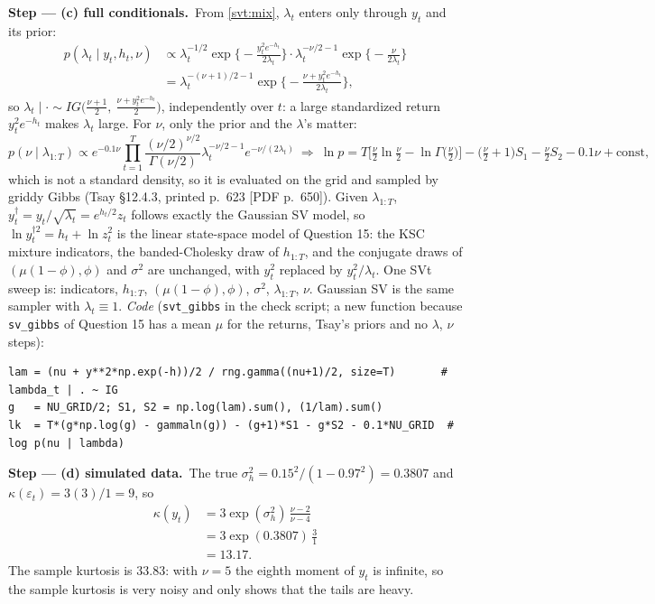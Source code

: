 \documentclass[11pt,a4paper]{article}
\newcommand{\passo}[2]{\par\smallskip\noindent\textbf{Step --- #1.}~#2}
\begin{document}
\begin{sol}
\passo{(c) full conditionals}{From \eqref{svt:mix}, $\lambda_t$ enters only through $y_t$ and its prior:}
\begin{align*}
p(\lambda_t\mid y_t,h_t,\nu) &\propto \lambda_t^{-1/2}\exp\!\Big\{-\frac{y_t^2e^{-h_t}}{2\lambda_t}\Big\}\cdot\lambda_t^{-\nu/2-1}\exp\!\Big\{-\frac{\nu}{2\lambda_t}\Big\}\\
&= \lambda_t^{-(\nu+1)/2-1}\exp\!\Big\{-\frac{\nu+y_t^2e^{-h_t}}{2\lambda_t}\Big\},
\end{align*}
so $\lambda_t\mid\cdot\sim IG\big(\tfrac{\nu+1}{2},\ \tfrac{\nu+y_t^2e^{-h_t}}{2}\big)$, independently over $t$: a large
standardized return $y_t^2e^{-h_t}$ makes $\lambda_t$ large. For $\nu$, only the prior and the $\lambda$'s matter:
\[ p(\nu\mid\lambda_{1:T})\propto e^{-0.1\nu}\prod_{t=1}^T\frac{(\nu/2)^{\nu/2}}{\Gamma(\nu/2)}\lambda_t^{-\nu/2-1}e^{-\nu/(2\lambda_t)}
\ \Rightarrow\ \ln p=T\Big[\tfrac{\nu}{2}\ln\tfrac{\nu}{2}-\ln\Gamma\big(\tfrac{\nu}{2}\big)\Big]-\Big(\tfrac{\nu}{2}+1\Big)S_1-\tfrac{\nu}{2}S_2-0.1\nu+\text{const}, \]
which is not a standard density, so it is evaluated on the grid and sampled by griddy Gibbs (Tsay \S12.4.3, printed p.~623 [PDF p.~650]).
Given $\lambda_{1:T}$, $y_t^\dagger=y_t/\sqrt{\lambda_t}=e^{h_t/2}z_t$ follows exactly the Gaussian SV model, so
$\ln y_t^{\dagger2}=h_t+\ln z_t^2$ is the linear state-space model of Question 15: the KSC mixture indicators,
the banded-Cholesky draw of $h_{1:T}$, and the conjugate draws of $(\mu(1-\phi),\phi)$ and $\sigma^2$ are
unchanged, with $y_t^2$ replaced by $y_t^2/\lambda_t$. One SVt sweep is: indicators, $h_{1:T}$,
$(\mu(1-\phi),\phi)$, $\sigma^2$, $\lambda_{1:T}$, $\nu$. Gaussian SV is the same sampler with $\lambda_t\equiv1$.
\noindent\textit{Code} (\texttt{svt\_gibbs} in the check script; a new function because \texttt{sv\_gibbs} of
Question 15 has a mean $\mu$ for the returns, Tsay's priors and no $\lambda$, $\nu$ steps):
\begingroup\footnotesize
\begin{verbatim}
lam = (nu + y**2*np.exp(-h))/2 / rng.gamma((nu+1)/2, size=T)       # lambda_t | . ~ IG
g   = NU_GRID/2; S1, S2 = np.log(lam).sum(), (1/lam).sum()
lk  = T*(g*np.log(g) - gammaln(g)) - (g+1)*S1 - g*S2 - 0.1*NU_GRID  # log p(nu | lambda)
\end{verbatim}
\endgroup

\passo{(d) simulated data}{The true $\sigma_h^2=0.15^2/(1-0.97^2)=0.3807$ and $\kappa(\varepsilon_t)=3(3)/1=9$, so}
\begin{align*}
\kappa(y_t) &= 3\exp(\sigma_h^2)\,\frac{\nu-2}{\nu-4}\\
&= 3\exp(0.3807)\,\frac{3}{1}\\
&= 13.17 .
\end{align*}
The sample kurtosis is $33.83$: with $\nu=5$ the eighth moment of $y_t$ is infinite, so the sample kurtosis
is very noisy and only shows that the tails are heavy.


\end{sol}
\end{document}

